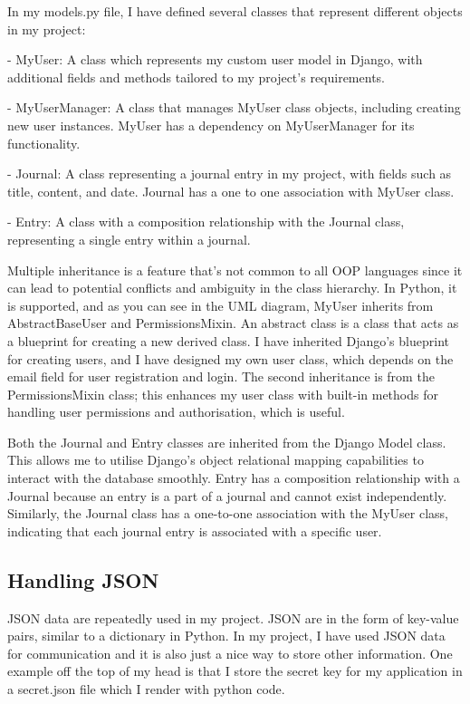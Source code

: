 In my models.py file, I have defined several classes that represent different objects in my project:

- MyUser: A class which represents my custom user model in Django, with additional fields and methods tailored to my project's requirements. 

- MyUserManager: A class that manages MyUser class objects, including creating new user instances. MyUser has a dependency on MyUserManager for its functionality.

- Journal: A class representing a journal entry in my project, with fields such as title, content, and date. Journal has a one to one association with MyUser class.

- Entry: A class with a composition relationship with the Journal class, representing a single entry within a journal.

Multiple inheritance is a feature that's not common to all OOP languages since it can lead to potential conflicts and ambiguity in the class hierarchy. In Python, it is supported, and as you can see in the UML diagram, MyUser inherits from AbstractBaseUser and PermissionsMixin. An abstract class is a class that acts as a blueprint for creating a new derived class. I have inherited Django's blueprint for creating users, and I have designed my own user class, which depends on the email field for user registration and login. The second inheritance is from the PermissionsMixin class; this enhances my user class with built-in methods for handling user permissions and authorisation, which is useful. 

Both the Journal and Entry classes are inherited from the Django Model class. This allows me to utilise Django's object relational mapping capabilities to interact with the database smoothly. Entry has a composition relationship with a Journal because an entry is a part of a journal and cannot exist independently. Similarly, the Journal class has a one-to-one association with the MyUser class, indicating that each journal entry is associated with a specific user.

\subsection{Handling JSON}
JSON data are repeatedly used in my project. JSON are in the form of key-value pairs, similar to a dictionary in Python. In my project, I have used JSON data for communication and it is also just a nice way to store other information. One example off the top of my head is that I store the secret key for my application in a secret.json file which I render with python code.

